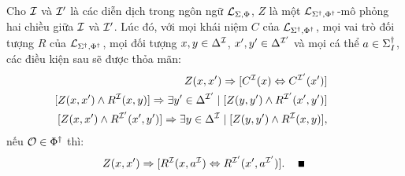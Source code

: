 \begin{Lemma}
	\label{lm:Condition}
	Cho $\mathcal{I}$ và $\mathcal{I}'$ là các diễn dịch trong ngôn ngữ $\mathcal{L}_{\Sigma,\Phi}$, $Z$ là một $\mathcal{L}_{\Sigma^\dag,\Phi^\dag}$-mô phỏng hai chiều giữa $\mathcal{I}$ và $\mathcal{I}'$. Lúc đó, với mọi khái niệm $C$ của $\mathcal{L}_{\Sigma^\dag,\Phi^\dag}$, mọi vai trò đối tượng $R$ của $\mathcal{L}_{\Sigma^\dag,\Phi^\dag}$, mọi đối tượng $x, y \in \Delta^{\mathcal{I}}$, $x', y' \in \Delta^{\mathcal{I}'}$ và mọi cá thể $a \in \Sigma^\dag_I$, các điều kiện sau sẽ được thỏa mãn:
	\begin{eqnarray}
	&&\!\!\!\!\!\!\!\!\!\!\!\!\!\!\!\!\!\!\!\!\! Z(x, x') \Rightarrow [C^\mI(x) \Leftrightarrow C^{\mI'}(x')] \label{bs:eqC3}\\
	&&\!\!\!\!\!\!\!\!\!\!\!\!\!\!\!\!\!\!\!\!\! [Z(x, x') \wedge R^\mI(x, y)] \Rightarrow \E y' \in \Delta^{\mI'} \mid [Z(y,y') \wedge R^{\mI'}(x',y')] \label{bs:eqR1}\\
	&&\!\!\!\!\!\!\!\!\!\!\!\!\!\!\!\!\!\!\!\!\! [Z(x, x') \wedge R^{\mI'}(x', y')] \Rightarrow \E y \in \Delta^\mI \mid [Z(y,y') \wedge R^\mI(x,y)], \label{bs:eqR2}
	\end{eqnarray}
	nếu $\mathcal{O} \in \Phi^\dag$ thì:
	\begin{eqnarray}
	&&\!\!\!\!\!\!\! Z(x, x') \Rightarrow [R^\mI(x, a^\mI) \Leftrightarrow R^{\mI'}(x', a^{\mI'})].\quad\label{bs:eqOR}\ \myend
	\end{eqnarray}
\end{Lemma}

